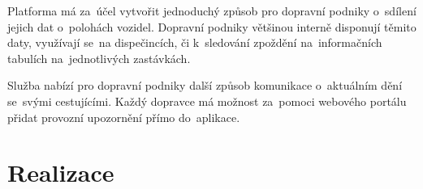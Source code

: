 \setlength{\headheight}{15.04742pt}
Platforma má za~účel vytvořit jednoduchý způsob pro dopravní podniky o~sdílení jejich dat o~polohách vozidel. Dopravní podniky většinou interně disponují těmito daty, využívají se~na dispečincích, či k~sledování zpoždění na~informačních tabulích na~jednotlivých zastávkách.\par Služba nabízí pro dopravní podniky další způsob komunikace o~aktuálním dění se~svými cestujícími. Každý dopravce má možnost za~pomoci webového portálu přidat provozní upozornění přímo do~aplikace.

\chapter{Realizace}


